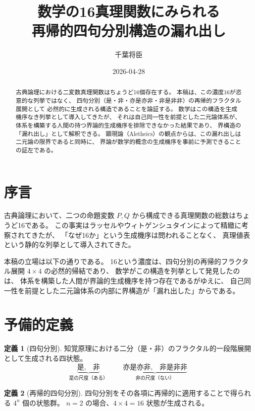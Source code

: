 \documentclass[11pt,a4paper]{article}
\theoremstyle{definition}
\newtheorem{definition}{定義}[section]
\begin{document}
\title{数学の16真理関数にみられる\\再帰的四句分別構造の漏れ出し}
\author{千葉将臣}
\date{2026-04-28}
\maketitle

\begin{abstract}
古典論理における二変数真理関数はちょうど16個存在する。
本稿は、この濃度16が恣意的な列挙ではなく、
四句分別（是・非・亦是亦非・非是非非）の再帰的フラクタル展開として
必然的に生成される構造であることを論証する。
数学はこの構造を生成機序なき列挙として導入してきたが、
それは自己同一性を前提とした二元論体系が、
体系を構築する人間の持つ界論的生成機序を排除できなかった結果であり、
界構造の「漏れ出し」として解釈できる。
顕現論（Aletheics）の観点からは、この漏れ出しは二元論の限界であると同時に、
界論が数学的概念の生成機序を事前に予測できることの証左である。
\end{abstract}

\section*{序言}

古典論理において、二つの命題変数 $P, Q$ から構成できる真理関数の総数はちょうど16である。
この事実はラッセルやウィトゲンシュタインによって精緻に考察されてきたが、
「なぜ16か」という生成機序は問われることなく、
真理値表という静的な列挙として導入されてきた。

本稿の立場は以下の通りである。
16という濃度は、四句分別の再帰的フラクタル展開 $4 \times 4$ の必然的帰結であり、
数学がこの構造を列挙として発見したのは、
体系を構築した人間が界論的生成機序を持つ存在であるがゆえに、
自己同一性を前提とした二元論体系の内部に界構造が「漏れ出した」からである。

\section{予備的定義}

\begin{definition}[四句分別]
知覚原理における二分（是・非）のフラクタル的一段階展開として生成される四状態。
\[
\underbrace{\text{是},\quad \text{非}}_{\text{是の尺度（ある）}}
\qquad
\underbrace{\text{亦是亦非},\quad \text{非是非非}}_{\text{非の尺度（ない）}}
\]
\end{definition}

\begin{definition}[再帰的四句分別]
四句分別をその各項に再帰的に適用することで得られる $4^n$ 個の状態群。
$n=2$ の場合、$4 \times 4 = 16$ 状態が生成される。
\end{definition}
\end{document}

